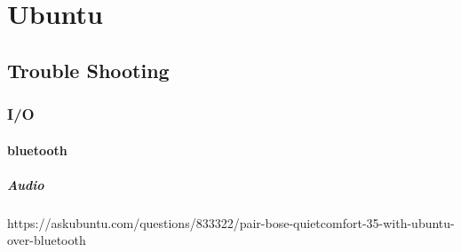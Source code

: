 \chapter{Ubuntu}

\section{Trouble Shooting}

\subsection{I/O}

\subsubsection{bluetooth}

\paragraph{Audio}

https://askubuntu.com/questions/833322/pair-bose-quietcomfort-35-with-ubuntu-over-bluetooth